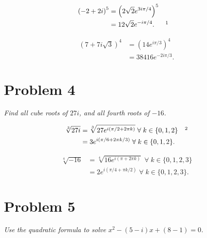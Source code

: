 \documentclass{tufte-handout}
\begin{document}
\begin{align*}
  {(-2 + 2i)}^5 &= {\left(2 \sqrt 2 e^{3 i \pi / 4} \right)}^5\\
                &= 12 \sqrt 2 e^{-i \pi / 4}. && \footnotemark
\end{align*}

\begin{align*}
  {\left( 7 + 7 i \sqrt 3 \right)}^4 &= {\left( 14 e^{i \pi / 3}
                                       \right)}^4\\
                                     &= 38416 e^{-2 i \pi / 3}.
\end{align*}

\section{Problem 4}

\begin{description}
\item \textit{Find all cube roots of $27i$, and all fourth roots of
    $-16$.}
\end{description}

\begin{align*}
  \sqrt[3]{27 i} &= \sqrt[3]{27 e^{i (\pi / 2 + 2 \pi k)}} \; \forall
  \; k \in \{0,1,2\} && \footnotemark\\
                 &= 3 e^{i (\pi / 6 + 2 \pi k / 3)} \; \forall \; k
                   \in \{0,1,2\}.
\end{align*}

\begin{align*}
  \sqrt[4]{-16} &= \sqrt[4]{16e^{i(\pi + 2\pi k)}} \; \forall \; k \in \{0,1,2,3\}\\
                &= 2e^{i(\pi / 4 + \pi k / 2)} \; \forall \; k \in \{0,1,2,3\}.
\end{align*}

\section{Problem 5}

\begin{description}
\item \textit{Use the quadratic formula to solve
    $x^2 - (5 - i)x + (8 - 1) = 0$.}
\end{description}
\end{document}
